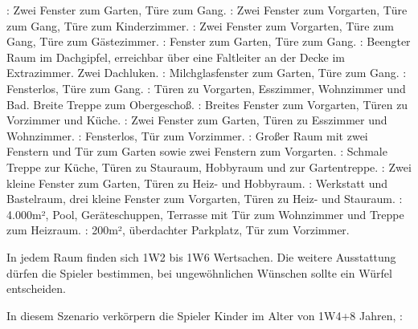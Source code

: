 {		: Zwei Fenster zum Garten, Türe zum Gang. : Zwei Fenster zum Vorgarten, Türe zum Gang, Türe zum Kinderzimmer. : Zwei Fenster zum Vorgarten, Türe zum Gang, Türe zum Gästezimmer. : Fenster zum Garten, Türe zum Gang. : Beengter Raum im Dachgipfel, erreichbar über eine Faltleiter an der Decke im Extrazimmer. Zwei Dachluken. : Milchglasfenster zum Garten, Türe zum Gang. : Fensterlos, Türe zum Gang. : Türen zu Vorgarten, Esszimmer, Wohnzimmer und Bad. Breite Treppe zum Obergeschoß. : Breites Fenster zum Vorgarten, Türen zu Vorzimmer und Küche. : Zwei Fenster zum Garten, Türen zu Esszimmer und Wohnzimmer. : Fensterlos, Tür zum Vorzimmer. : Großer Raum mit zwei Fenstern und Tür zum Garten sowie zwei Fenstern zum Vorgarten. : Schmale Treppe zur Küche, Türen zu Stauraum, Hobbyraum und zur Gartentreppe. : Zwei kleine Fenster zum Garten, Türen zu Heiz- und Hobbyraum. : Werkstatt und Bastelraum, drei kleine Fenster zum Vorgarten, Türen zu Heiz- und Stauraum. : 4.000m², Pool, Geräteschuppen, Terrasse mit Tür zum Wohnzimmer und Treppe zum Heizraum. : 200m², überdachter Parkplatz, Tür zum Vorzimmer.

		In jedem Raum finden sich 1W2 bis 1W6 Wertsachen. Die weitere Ausstattung dürfen die Spieler bestimmen, bei ungewöhnlichen Wünschen sollte ein Würfel entscheiden.


		\noindent
		In diesem Szenario verkörpern die Spieler Kinder im Alter von 1W4+8 Jahren, \zB:


}
